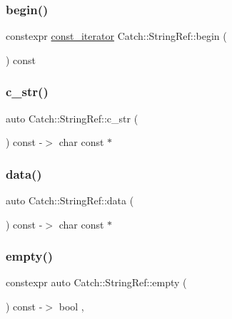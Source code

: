\subsubsection{\texorpdfstring{begin()}{begin()}}
{\footnotesize\ttfamily constexpr \mbox{\hyperlink{class_catch_1_1_string_ref_ac3aa3d16f48b5429a480f823c504f93c}{const\+\_\+iterator}} Catch\+::\+String\+Ref\+::begin (\begin{DoxyParamCaption}{ }\end{DoxyParamCaption}) const\hspace{0.3cm}{\ttfamily [inline]}}

\mbox{\label{class_catch_1_1_string_ref_a1669cb2765e820ca258159676cbd82a5}} 
\subsubsection{\texorpdfstring{c\+\_\+str()}{c\_str()}}
{\footnotesize\ttfamily auto Catch\+::\+String\+Ref\+::c\+\_\+str (\begin{DoxyParamCaption}{ }\end{DoxyParamCaption}) const -\/$>$  char const $\ast$}

\mbox{\label{class_catch_1_1_string_ref_ab0f85edde9f97153fc758fac3bb14507}} 
\subsubsection{\texorpdfstring{data()}{data()}}
{\footnotesize\ttfamily auto Catch\+::\+String\+Ref\+::data (\begin{DoxyParamCaption}{ }\end{DoxyParamCaption}) const -\/$>$  char const $\ast$\hspace{0.3cm}{\ttfamily [noexcept]}}

\mbox{\label{class_catch_1_1_string_ref_a0b4841c28cbb14ba07296964a0187023}} 
\subsubsection{\texorpdfstring{empty()}{empty()}}
{\footnotesize\ttfamily constexpr auto Catch\+::\+String\+Ref\+::empty (\begin{DoxyParamCaption}{ }\end{DoxyParamCaption}) const -\/$>$ bool \hspace{0.3cm}{\ttfamily [inline]}, {\ttfamily [noexcept]}}

